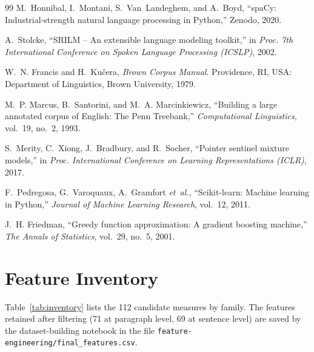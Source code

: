 \documentclass[12pt,a4paper,oneside]{report}
\begin{document}
\begin{thebibliography}{99}
M.~Honnibal, I.~Montani, S.~Van~Landeghem, and A.~Boyd, ``spaCy: Industrial-strength natural language processing in Python,'' Zenodo, 2020.

A.~Stolcke, ``SRILM -- An extensible language modeling toolkit,'' in \emph{Proc. 7th International Conference on Spoken Language Processing (ICSLP)}, 2002.

W.~N. Francis and H.~Ku\v{c}era, \emph{Brown Corpus Manual}. Providence, RI, USA: Department of Linguistics, Brown University, 1979.

M.~P. Marcus, B.~Santorini, and M.~A. Marcinkiewicz, ``Building a large annotated corpus of English: The Penn Treebank,'' \emph{Computational Linguistics}, vol.~19, no.~2, 1993.

S.~Merity, C.~Xiong, J.~Bradbury, and R.~Socher, ``Pointer sentinel mixture models,'' in \emph{Proc. International Conference on Learning Representations (ICLR)}, 2017.

F.~Pedregosa, G.~Varoquaux, A.~Gramfort \emph{et~al.}, ``Scikit-learn: Machine learning in Python,'' \emph{Journal of Machine Learning Research}, vol.~12, 2011.

J.~H. Friedman, ``Greedy function approximation: A gradient boosting machine,'' \emph{The Annals of Statistics}, vol.~29, no.~5, 2001.

\end{thebibliography}

\appendix

\chapter{Feature Inventory}
\label{app:features}
Table~\ref{tab:inventory} lists the 112 candidate measures by family. The features retained after filtering (71 at paragraph level, 69 at sentence level) are saved by the dataset-building notebook in the file \nolinkurl{feature-engineering/final_features.csv}.
\end{document}
